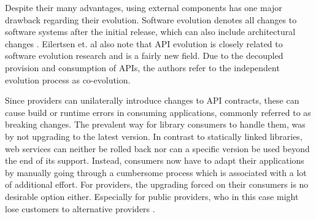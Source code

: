 Despite their many advantages, using external components has one major drawback regarding their evolution. Software evolution denotes all changes to software systems after the initial release, which can also include architectural changes \cite{eilertsen_exploring_2018}. Eilertsen et. al also note that \ac{API} evolution is closely related to software evolution research and is a fairly new field. Due to the decoupled provision and consumption of APIs, the authors refer to the independent evolution process as co-evolution. 

Since providers can unilaterally introduce changes to API contracts, these can cause build or runtime errors in consuming applications, commonly referred to as breaking changes. The prevalent way for library consumers to handle them, was by not upgrading to the latest version. In contrast to statically linked libraries, web services can neither be rolled back nor can a specific version be used beyond the end of its support. Instead, consumers now have to adapt their applications by manually going through a cumbersome process which is associated with a lot of additional effort. For providers, the upgrading forced on their consumers is no desirable option either. Especially for public providers, who in this case might lose customers to alternative providers \cite[p.3]{lubke_interface_2019}. 





